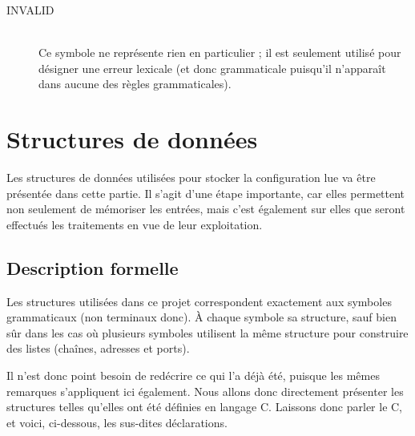 \documentclass[a4paper,11pt]{report}
\begin{document}
\begin{description}
  \item[INVALID]~\\
    Ce symbole ne représente rien en particulier ; il est seulement utilisé
    pour désigner une erreur lexicale (et donc grammaticale puisqu'il
    n'apparaît dans aucune des règles grammaticales).
\end{description}

\chapter{Structures de données}

\begin{intro}
  Les structures de données utilisées pour stocker la configuration lue va
  être présentée dans cette partie. Il s'agit d'une étape importante, car
  elles permettent non seulement de mémoriser les entrées, mais c'est
  également sur elles que seront effectués les traitements en vue de leur
  exploitation.
\end{intro}

\section{Description formelle}

Les structures utilisées dans ce projet correspondent exactement aux symboles
grammaticaux (non terminaux donc). À chaque symbole sa structure, sauf bien
sûr dans les cas où plusieurs symboles utilisent la même structure pour
construire des listes (chaînes, adresses et ports).

Il n'est donc point besoin de redécrire ce qui l'a déjà été, puisque les mêmes
remarques s'appliquent ici également. Nous allons donc directement présenter
les structures telles qu'elles ont été définies en langage C. Laissons donc
parler le C, et voici, ci-dessous, les sus-dites déclarations.
\end{document}

